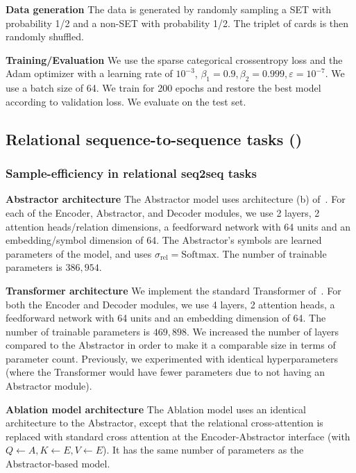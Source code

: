 \textbf{Data generation} The data is generated by randomly sampling a SET with probability 1/2 and a non-SET with probability 1/2. The triplet of cards is then randomly shuffled.

\textbf{Training/Evaluation} We use the sparse categorical crossentropy loss and the Adam optimizer with a learning rate of $10^{-3}$, $\beta_1 = 0.9, \beta_2 = 0.999, \varepsilon = 10^{-7}$. We use a batch size of 64. We train for 200 epochs and restore the best model according to validation loss. We evaluate on the test set.


\subsection{Relational sequence-to-sequence tasks ()}

\subsubsection{Sample-efficiency in relational seq2seq tasks}

\textbf{Abstractor architecture} The Abstractor model uses architecture (b) of~. For each of the Encoder, Abstractor, and Decoder modules, we use 2 layers, 2 attention heads/relation dimensions, a feedforward network with 64 units and an embedding/symbol dimension of 64. The Abstractor's symbols are learned parameters of the model, and uses $\sigma_{\mathrm{rel}} = \mathrm{Softmax}$. The number of trainable parameters is $386,954$.

\textbf{Transformer architecture} We implement the standard Transformer of~\citep{vaswani2017attention}. For both the Encoder and Decoder modules, we use 4 layers, 2 attention heads, a feedforward network with 64 units and an embedding dimension of 64. The number of trainable parameters is $469,898$. We increased the number of layers compared to the Abstractor in order to make it a comparable size in terms of parameter count. Previously, we experimented with identical hyperparameters (where the Transformer would have fewer parameters due to not having an Abstractor module).

\textbf{Ablation model architecture} The Ablation model uses an identical architecture to the Abstractor, except that the relational cross-attention is replaced with standard cross attention at the Encoder-Abstractor interface (with $Q \gets A, K \gets E, V \gets E$). It has the same number of parameters as the Abstractor-based model.

